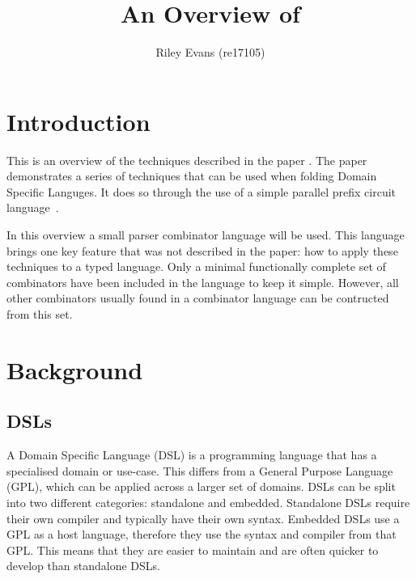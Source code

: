\documentclass[a4paper, twocolumn, 10pt]{extarticle}
\title{\vspace{-10mm}An Overview of \citetalias{embedding}\vspace{-4mm}}
\author{Riley Evans (re17105)}
\date{\vspace{-3mm}}
\begin{document}
\maketitle


\section{Introduction}

This is an overview of the techniques described in the paper .
The paper demonstrates a series of techniques that can be used when folding Domain Specific Languges.
It does so through the use of a simple parallel prefix circuit language~\cite{scans}.


In this overview a small parser combinator language will be used.
This language brings one key feature that was not described in the paper: how to apply these techniques to a typed language.
Only a minimal functionally complete set of combinators have been included in the language to keep it simple.
However, all other combinators usually found in a combinator language can be contructed from this set.










\section{Background}

\subsection{DSLs}

A Domain Specific Language (DSL) is a programming language that has a specialised domain or use-case.
This differs from a General Purpose Language (GPL), which can be applied across a larger set of domains.
DSLs can be split into two different categories: standalone and embedded. Standalone DSLs require their own compiler and typically have their own syntax.
Embedded DSLs use a GPL as a host language, therefore they use the syntax and compiler from that GPL.
This means that they are easier to maintain and are often quicker to develop than standalone DSLs.
\end{document}
